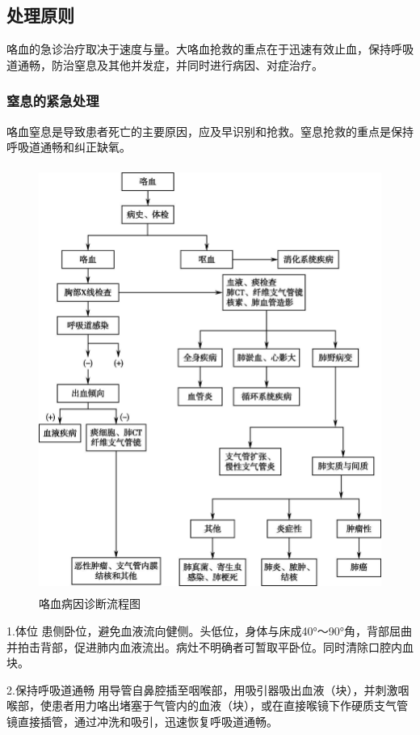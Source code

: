 \subsection{处理原则}

咯血的急诊治疗取决于速度与量。大咯血抢救的重点在于迅速有效止血，保持呼吸道通畅，防治窒息及其他并发症，并同时进行病因、对症治疗。

\subsubsection{窒息的紧急处理}

咯血窒息是导致患者死亡的主要原因，应及早识别和抢救。窒息抢救的重点是保持呼吸道通畅和纠正缺氧。

\begin{figure}[!htbp]
 \centering
 \includegraphics[width=4.55208in,height=5.47917in]{./images/Image00048.jpg}
 \captionsetup{justification=centering}
 \caption{咯血病因诊断流程图}
 \label{fig9-1}
  \end{figure} 

1.体位
患侧卧位，避免血液流向健侧。头低位，身体与床成40°～90°角，背部屈曲并拍击背部，促进肺内血液流出。病灶不明确者可暂取平卧位。同时清除口腔内血块。

2.保持呼吸道通畅
用导管自鼻腔插至咽喉部，用吸引器吸出血液（块），并刺激咽喉部，使患者用力咯出堵塞于气管内的血液（块），或在直接喉镜下作硬质支气管镜直接插管，通过冲洗和吸引，迅速恢复呼吸道通畅。

